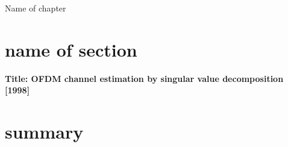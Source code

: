 \begin{chapter}{Name of chapter}
\setcounter{secnumdepth}{2}
\label{chap:chap2}

\section{name of section}
\textbf{Title: OFDM channel estimation by singular value decomposition \cite{edf}[1998]}\\
 
\section{summary}

\end{chapter}
